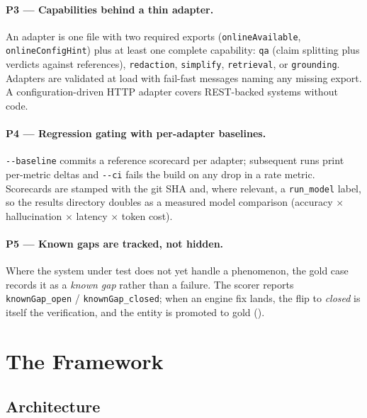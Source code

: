 \documentclass[11pt,a4paper]{article}
\begin{document}
\paragraph{P3 --- Capabilities behind a thin adapter.}
An adapter is one file with two required exports (\texttt{onlineAvailable},
\texttt{onlineConfigHint}) plus at least one complete capability: \texttt{qa} (claim splitting plus
verdicts against references), \texttt{redaction}, \texttt{simplify}, \texttt{retrieval}, or
\texttt{grounding}. Adapters are validated at load with fail-fast messages naming any missing export.
A configuration-driven HTTP adapter covers REST-backed systems without code.

\paragraph{P4 --- Regression gating with per-adapter baselines.}
\texttt{-{}-baseline} commits a reference scorecard per adapter; subsequent runs print per-metric
deltas and \texttt{-{}-ci} fails the build on any drop in a rate metric. Scorecards are stamped with
the git SHA and, where relevant, a \texttt{run\_model} label, so the results directory doubles as a
measured model comparison (accuracy $\times$ hallucination $\times$ latency $\times$ token cost).

\paragraph{P5 --- Known gaps are tracked, not hidden.}
Where the system under test does not yet handle a phenomenon, the gold case records it as a
\emph{known gap} rather than a failure. The scorer reports \texttt{knownGap\_open} /
\texttt{knownGap\_closed}; when an engine fix lands, the flip to \emph{closed} is itself the
verification, and the entity is promoted to gold ().

\section{The Framework}

\subsection{Architecture}
\end{document}
